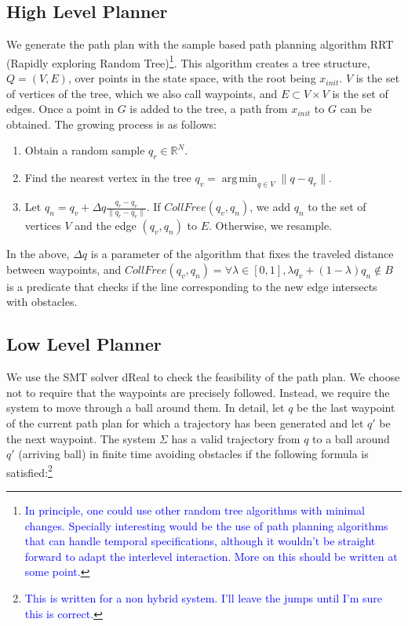 \documentclass[12pt]{article}
\DeclareMathOperator*{\argmin}{arg\,min}
\newcommand\fran[1]{\textcolor{blue}{#1}}
\newcommand\ffran[1]{\textcolor{blue}{\footnote{\fran{#1}}}}
\begin{document}
\subsection{High Level Planner}
\label{sub:high_level_planner}

We generate the path plan with the sample based path planning algorithm RRT (Rapidly exploring Random Tree)\ffran{In principle, one could use other random tree algorithms with minimal changes. Specially interesting would be the use of path planning algorithms that can handle temporal specifications, although it wouldn't be straight forward to adapt the interlevel interaction. More on this should be written at some point.}. This algorithm creates a tree structure, $Q = (V, E)$, over points in the state space, with the root being $x_{init}$. $V$ is the set of vertices of the tree, which we also call waypoints, and $E \subset V \times V$ is the set of edges. Once a point in $G$ is added to the tree, a path from $x_{init}$ to $G$ can be obtained. The growing process is as follows:

\begin{enumerate}
    \item Obtain a random sample $q_r \in \mathbb{R}^N$.
    \item Find the nearest vertex in the tree $q_v = \argmin_{q \in V} \|q - q_r\|$.
    \item Let $q_n = q_v + \Delta q \frac{q_r - q_v}{\|q_r - q_v\|}$. If $CollFree(q_v, q_n)$, we add $q_n$ to the set of vertices $V$ and the edge $(q_v, q_n)$ to $E$. Otherwise, we resample.
\end{enumerate}

In the above, $\Delta q$ is a parameter of the algorithm that fixes the traveled distance between waypoints, and $CollFree(q_v, q_n) = \forall \lambda \in [0, 1], \lambda q_v + (1 - \lambda) q_n \notin B$ is a predicate that checks if the line corresponding to the new edge intersects with obstacles.

\subsection{Low Level Planner}
\label{sub:low_level_planner}

We use the SMT solver dReal to check the feasibility of the path plan. We choose not to require that the waypoints are precisely followed. Instead, we require the system to move through a ball around them. In detail, let $q$ be the last waypoint of the current path plan for which a trajectory has been generated and let $q'$ be the next waypoint. The system $\Sigma$ has a valid trajectory from $q$ to a ball around $q'$ (arriving ball) in finite time avoiding obstacles if the following formula is satisfied:\ffran{This is written for a non hybrid system. I'll leave the jumps until I'm sure this is correct.}
\end{document}
